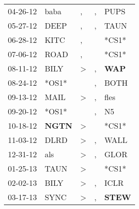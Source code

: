\begin{supertabular}{p{0.07\textwidth}p{0.06\textwidth}p{0.02\textwidth}p{0.02\textwidth}p{0.06\textwidth}}
          04-26-12\textsuperscript{} &           baba\textsuperscript{} &                , &                , &           PUPS\textsuperscript{} \\
          05-27-12\textsuperscript{} &           DEEP\textsuperscript{} &                , &                , &           TAUN\textsuperscript{} \\
          06-28-12\textsuperscript{} &           KITC\textsuperscript{} &                , &                  &                            *CS1* \\
          07-06-12\textsuperscript{} &           ROAD\textsuperscript{} &                , &                  &                            *CS1* \\
          08-11-12\textsuperscript{} &           BILY\textsuperscript{} &     \textgreater &                , &   \textbf{WAP\textsuperscript{}} \\
          08-24-12\textsuperscript{} &                            *OS1* &                  &                , &           BOTH\textsuperscript{} \\
          09-13-12\textsuperscript{} &           MAIL\textsuperscript{} &     \textgreater &                , &           fles\textsuperscript{} \\
          09-20-12\textsuperscript{} &                            *OS1* &                  &                , &             N5\textsuperscript{} \\
          10-18-12\textsuperscript{} &  \textbf{NGTN\textsuperscript{}} &     \textgreater &                  &                            *CS1* \\
          11-03-12\textsuperscript{} &           DLRD\textsuperscript{} &     \textgreater &                , &           WALL\textsuperscript{} \\
          12-31-12\textsuperscript{} &            als\textsuperscript{} &     \textgreater &                , &           GLOR\textsuperscript{} \\
          01-25-13\textsuperscript{} &           TAUN\textsuperscript{} &     \textgreater &                  &                            *CS1* \\
          02-02-13\textsuperscript{} &           BILY\textsuperscript{} &     \textgreater &                , &           ICLR\textsuperscript{} \\
          03-17-13\textsuperscript{} &           SYNC\textsuperscript{} &     \textgreater &                , &  \textbf{STEW\textsuperscript{}} \\

\end{supertabular}
